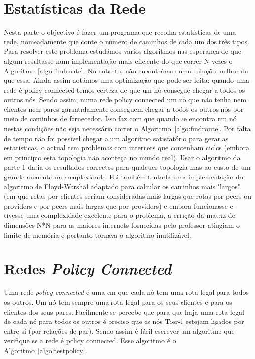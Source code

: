 \documentclass[10pt,a4paper]{article}
\begin{document}
\section{Estatísticas da Rede}
Nesta parte o objectivo é fazer um programa que recolha estatísticas de uma rede, nomeadamente que conte o número de caminhos de cada um dos três tipos. Para resolver este problema estudámos vários algoritmos nas esperança de que algum resultasse num implementação mais eficiente do que correr N vezes o Algoritmo~\ref{algo:findroute}. No entanto, não encontrámos uma solução melhor do que essa. Ainda assim notámos uma optimização que pode ser feita: quando uma rede é policy connected temos certeza de que um nó consegue chegar a todos os outros nós. Sendo assim, numa rede policy connected um nó que não tenha nem clientes nem pares garantidamente conseguem chegar a todos os outros nós por meio de caminhos de fornecedor. Isso faz com que quando se encontra um nó nestas condições não seja necessário correr o Algoritmo~\ref{algo:findroute}. Por falta de tempo não foi possível chegar a um algoritmo satisfatório para gerar as estatísticas, o actual tem problemas com internets que contenham ciclos (embora em principio esta topologia não aconteça no mundo real). Usar o algoritmo da parte 1 daria os resultados correctos para qualquer topologia mas ao custo de um grande aumento na complexidade. Foi também tentada uma implementação do algoritmo de Floyd-Warshal adaptado para calcular os caminhos mais "largos" (em que rotas por clientes seriam consideradas mais largas que rotas por peers ou providers e por peers mais largas que por providers) e embora funcionasse e tivesse uma complexidade excelente para o problema, a criação da matriz de dimensões N*N para as maiores internets fornecidas pelo professor atingiam o limite de memória e portanto tornava o algoritmo inutilizável.



\section{Redes \textit{Policy Connected}}
Uma rede \textit{policy connected} é uma em que cada nó tem uma rota legal para todos os outros. Um nó tem sempre uma rota legal para os seus clientes e para os clientes dos seus pares. Facilmente se percebe que para que haja uma rota legal de cada nó para todos os outros é preciso que os nós Tier-1 estejam ligados por entre si (por relações de par). Sendo assim é fácil escrever um algoritmo que verifique se a rede é policy connected. Esse algoritmo é o Algoritmo~\ref{algo:testpolicy}.
\end{document}
